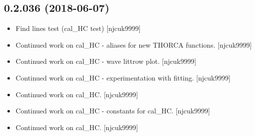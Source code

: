 \documentclass[a4paper,10pt,english]{report}
\begin{document}
\subsection{0.2.036 (2018-06-07)}
\label{\detokenize{misc/changelog:id424}}\begin{itemize}
\item {} 
Find lines test (cal\_HC test) {[}njcuk9999{]}

\item {} 
Continued work on cal\_HC - aliases for new THORCA functions.
{[}njcuk9999{]}

\item {} 
Continued work on cal\_HC - wave littrow plot. {[}njcuk9999{]}

\item {} 
Continued work on cal\_HC - experimentation with fitting. {[}njcuk9999{]}

\item {} 
Continued work on cal\_HC. {[}njcuk9999{]}

\item {} 
Continued work on cal\_HC - constants for cal\_HC. {[}njcuk9999{]}

\item {} 
Continued work on cal\_HC. {[}njcuk9999{]}

\end{itemize}
\end{document}

